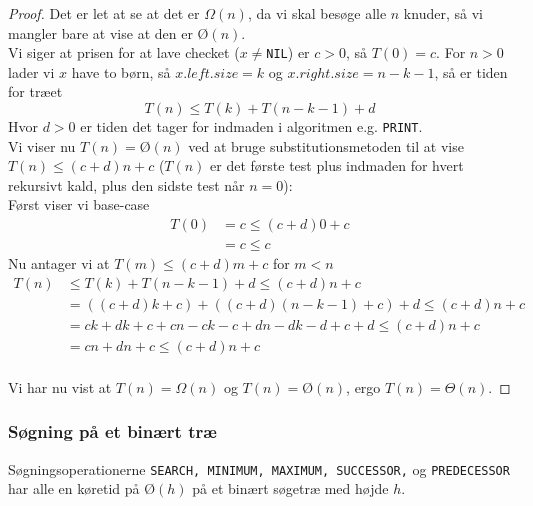 \begin{proof}
  Det er let at se at det er $\Omega(n)$, da vi skal besøge alle $n$ knuder, så vi mangler bare at vise at den er $Ø(n)$.\\

  Vi siger at prisen for at lave checket ($x \neq$\texttt{NIL}) er $c>0$, så $T(0) = c$. For $n > 0$ lader vi $x$ have to børn, så $x.left.size = k$ og $x.right.size = n - k - 1$, så er tiden for træet
  $$T(n) \leq T(k) + T(n-k-1) + d$$
  Hvor $d > 0$ er tiden det tager for indmaden i algoritmen e.g. \texttt{PRINT}.\\
  
  Vi viser nu $T(n) = Ø(n)$ ved at bruge substitutionsmetoden til at vise $T(n) \leq (c+d)n + c$ ($T(n)$ er det første test plus indmaden for hvert rekursivt kald, plus den sidste test når $n=0$):\\
  Først viser vi base-case
  \begin{align*}
    T(0) &= c \leq (c + d)0 + c\\
         &= c \leq c
  \end{align*}
  Nu antager vi at $T(m) \leq (c+d)m + c$ for $m < n$
  \begin{align*}
    T(n) &\leq T(k) + T(n-k-1) + d \leq (c+d)n + c\\
         &= ((c+d)k + c) + ((c+d)(n-k-1) + c) + d \leq (c+d)n + c\\
         &= ck + dk + c + cn - ck - c + dn - dk - d + c + d \leq (c+d)n + c\\
         &= cn + dn + c  \leq (c + d)n + c\\
  \end{align*}

  Vi har nu vist at $T(n) = \Omega(n)$ og $T(n) = Ø(n)$, ergo $T(n) = \Theta(n)$.
\end{proof}

\subsubsection{Søgning på et binært træ}

\begin{theorem}
  Søgningsoperationerne \texttt{SEARCH, MINIMUM, MAXIMUM, SUCCESSOR,} og \texttt{PREDECESSOR} har alle en køretid på $Ø(h)$ på et binært søgetræ med højde $h$.
\end{theorem}

